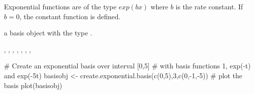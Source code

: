 \documentclass{article}
\begin{document}
\begin{Details}\relax
Exponential functions are of the type $exp(bx)$ where $b$
is the rate constant.  If $b = 0$, the constant function is
defined.
\end{Details}
\begin{Value}
a basis object with the type .
\end{Value}
\begin{SeeAlso}\relax
{}, 
, 
, 
, 
, 
, 
, 
\end{SeeAlso}
\begin{Examples}
\begin{ExampleCode}

#  Create an exponential basis over interval [0,5]
#  with basis functions 1, exp(-t) and exp(-5t)
basisobj <- create.exponential.basis(c(0,5),3,c(0,-1,-5))
#  plot the basis
plot(basisobj)

\end{ExampleCode}
\end{Examples}
\end{document}
